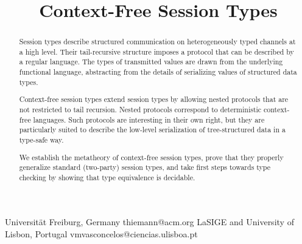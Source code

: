 \documentclass{sigplanconf}
\begin{document}
\toappear{}






\title{Context-Free Session Types}%

           {Universität Freiburg, Germany}
           {thiemann@acm.org}
           {LaSIGE and University of Lisbon, Portugal}
           {vmvasconcelos@ciencias.ulisboa.pt}

\maketitle

\begin{abstract}
Session types describe structured communication on heterogeneously
typed channels at a high level.
Their tail-recursive structure imposes a protocol that can be
described by a regular language. 
The types of transmitted values are drawn from the underlying
functional language, abstracting from the
details of serializing values of structured data types.

Context-free session types extend session types by allowing nested
protocols that are not restricted to tail recursion. Nested protocols
correspond to deterministic context-free languages. Such protocols are
interesting in their own right, but they are particularly suited to
describe the low-level serialization of tree-structured data in a
type-safe way.  

We establish the metatheory of context-free session types, prove that
they properly generalize standard (two-party) session
types, and take first steps towards type checking by showing
that type equivalence is decidable.
\end{abstract}
\end{document}
